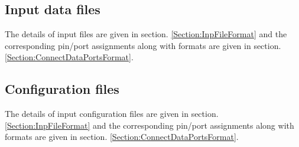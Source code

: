 
\subsection{Input data files}

The details of input files are given in section. \ref{Section:InpFileFormat} and the corresponding pin/port assignments along with formats are given in section. \ref{Section:ConnectDataPortsFormat}.

\subsection{Configuration files}
The details of input configuration files are given in section. \ref{Section:InpFileFormat} and the corresponding pin/port assignments along with formats are given in section. \ref{Section:ConnectDataPortsFormat}.
